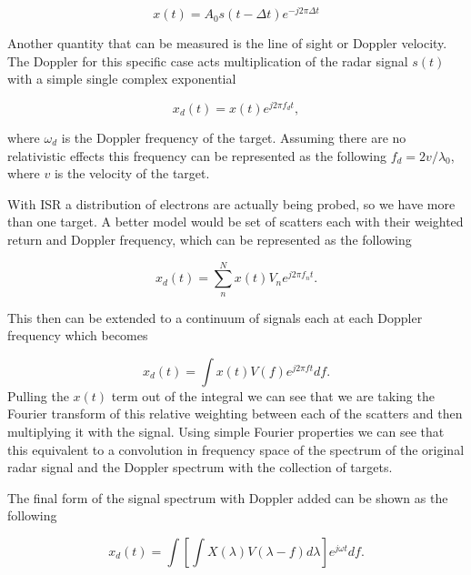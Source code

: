 \begin{equation}
\label{eqn:baseband}
x(t)=A_0s(t-\Delta t)e^{-j2\pi\Delta t}
\end{equation}

Another quantity that can be measured is the line of sight or Doppler velocity. The Doppler for this specific case acts multiplication of the radar signal $s(t)$ with a simple single complex exponential

\begin{equation}
\label{simpledop}
x_d(t) = x(t)e^{j2\pi f_d t},
\end{equation}
 
\noindent where $\omega_d$ is the Doppler frequency of the target. Assuming there are no relativistic effects this frequency can be represented as the following $f_d = 2v/\lambda_0 $, where $v$ is the velocity of the target. 



With ISR a distribution of electrons are actually being probed, so we have more than one target. A better model would be set of scatters each with their weighted return and Doppler frequency, which can be represented as the following

\begin{equation}
\label{multiDop}
\displaystyle x_d(t) = \sum_{n}^{N} x(t)V_ne^{j2\pi f_{n} t}.
\end{equation}


\noindent This then can be extended to a continuum of signals each at each Doppler frequency which becomes

\begin{equation}
\label{conDop}
x_d(t) = \int x(t) V(f)e^{j2\pi ft} df.
\end{equation}
\noindent Pulling the $x(t)$ term out of the integral we can see that we are taking the Fourier transform of this relative weighting between each of the scatters and then multiplying it with the signal.  Using simple Fourier properties we can see that this equivalent to a convolution in frequency space of the spectrum of the original radar signal and the Doppler spectrum with the collection of targets.  

The final form of the signal spectrum with Doppler added can be shown as the following

\begin{equation}
\label{finalDop}
x_d(t) = \int \left[\int X(\lambda)V(\lambda-f)d\lambda\right] e^{j\omega t}df.
\end{equation}


